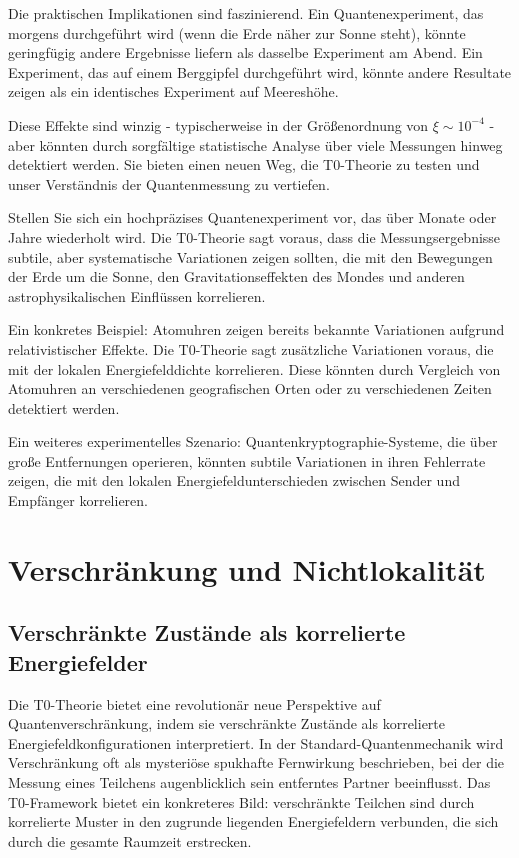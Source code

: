 \documentclass[12pt,a4paper]{article}
\newcommand{\xipar}{\xi}
\theoremstyle{definition}
\theoremstyle{remark}
\begin{document}
Die praktischen Implikationen sind faszinierend. Ein Quantenexperiment, das morgens durchgeführt wird (wenn die Erde näher zur Sonne steht), könnte geringfügig andere Ergebnisse liefern als dasselbe Experiment am Abend. Ein Experiment, das auf einem Berggipfel durchgeführt wird, könnte andere Resultate zeigen als ein identisches Experiment auf Meereshöhe.

Diese Effekte sind winzig - typischerweise in der Größenordnung von $\xipar \sim 10^{-4}$ - aber könnten durch sorgfältige statistische Analyse über viele Messungen hinweg detektiert werden. Sie bieten einen neuen Weg, die T0-Theorie zu testen und unser Verständnis der Quantenmessung zu vertiefen.

Stellen Sie sich ein hochpräzises Quantenexperiment vor, das über Monate oder Jahre wiederholt wird. Die T0-Theorie sagt voraus, dass die Messungsergebnisse subtile, aber systematische Variationen zeigen sollten, die mit den Bewegungen der Erde um die Sonne, den Gravitationseffekten des Mondes und anderen astrophysikalischen Einflüssen korrelieren.

Ein konkretes Beispiel: Atomuhren zeigen bereits bekannte Variationen aufgrund relativistischer Effekte. Die T0-Theorie sagt zusätzliche Variationen voraus, die mit der lokalen Energiefelddichte korrelieren. Diese könnten durch Vergleich von Atomuhren an verschiedenen geografischen Orten oder zu verschiedenen Zeiten detektiert werden.

Ein weiteres experimentelles Szenario: Quantenkryptographie-Systeme, die über große Entfernungen operieren, könnten subtile Variationen in ihren Fehlerrate zeigen, die mit den lokalen Energiefeldunterschieden zwischen Sender und Empfänger korrelieren.

\section{Verschränkung und Nichtlokalität}

\subsection{Verschränkte Zustände als korrelierte Energiefelder}

Die T0-Theorie bietet eine revolutionär neue Perspektive auf Quantenverschränkung, indem sie verschränkte Zustände als korrelierte Energiefeldkonfigurationen interpretiert. In der Standard-Quantenmechanik wird Verschränkung oft als mysteriöse spukhafte Fernwirkung beschrieben, bei der die Messung eines Teilchens augenblicklich sein entferntes Partner beeinflusst. Das T0-Framework bietet ein konkreteres Bild: verschränkte Teilchen sind durch korrelierte Muster in den zugrunde liegenden Energiefeldern verbunden, die sich durch die gesamte Raumzeit erstrecken.
\end{document}
